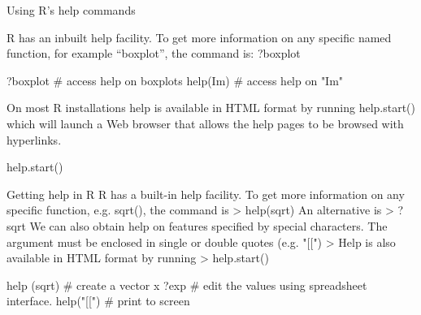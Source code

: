 \begin{frame}

Using R's help commands

R has an inbuilt help facility. To get more information on any specific named function, for example “boxplot”, the command is: ?boxplot


?boxplot		# access help on boxplots
help(Im)        # access help on "Im"

\end{frame}
\begin{frame}

On most R installations help is available in HTML format by running help.start() which will launch a Web browser that allows the help pages to be browsed with hyperlinks. 
 



help.start()

\end{frame}
\begin{frame}

Getting help in R
R has a built-in help facility. To get more information on any specific function, e.g. sqrt(), the command is
> help(sqrt)
An alternative is
> ? sqrt
We can also obtain help on features specified by special characters.
The argument must be enclosed in single or double quotes (e.g. "[[")
> 
Help is also available in HTML format by running
> help.start()


\end{frame}
\begin{frame}
help (sqrt)   	      # create a vector x
?exp  	   		  # edit the values using spreadsheet interface.
help("[[")	         # print to screen

\end{frame}
